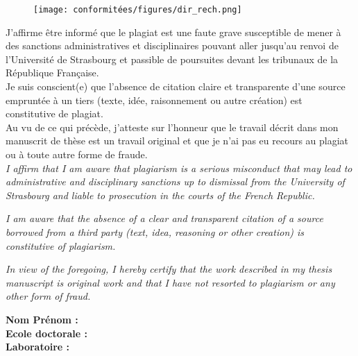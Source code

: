 \newpage
\thispagestyle{empty}

\begin{figure}[!h]
    \texttt{[image: conformitées/figures/dir\_rech.png]}
\end{figure}


\justify
{\setlength{\parindent}{0pt}

J’affirme être informé que le plagiat est une faute grave susceptible de mener à des sanctions administratives et disciplinaires pouvant aller jusqu’au renvoi de l’Université de Strasbourg et passible de poursuites devant les tribunaux de la République Française.\\

Je suis conscient(e) que l’absence de citation claire et transparente d’une source empruntée à un tiers (texte, idée, raisonnement ou autre création) est constitutive de plagiat.\\

Au vu de ce qui précède, j’atteste sur l’honneur que le travail décrit dans mon manuscrit de thèse est un travail original et que je n’ai pas eu recours au plagiat ou à toute autre forme de fraude.\\

\textit{I affirm that I am aware that plagiarism is a serious misconduct that may lead to administrative and disciplinary sanctions up to dismissal from the University of Strasbourg and liable to prosecution in the courts of the French Republic.\\}

\textit{I am aware that the absence of a clear and transparent citation of a source borrowed from a third party (text, idea, reasoning or other creation) is constitutive of plagiarism.\\}

\textit{In view of the foregoing, I hereby certify that the work described in my thesis manuscript is original work and that I have not resorted to plagiarism or any other form of fraud.\\[1cm]}


\textbf{Nom Prénom :} \name \\
\textbf{Ecole doctorale :} \ed \\
\textbf{Laboratoire :} \lab
}
